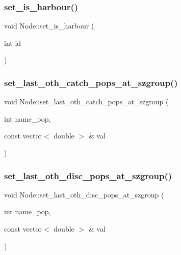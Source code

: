 \mbox{\label{class_node_a5200fc9b871d1dc60b4106fabd08a202}} 
\subsubsection{\texorpdfstring{set\_is\_harbour()}{set\_is\_harbour()}}
{\footnotesize\ttfamily void Node\+::set\+\_\+is\+\_\+harbour (\begin{DoxyParamCaption}\item[{int}]{id }\end{DoxyParamCaption})}

\mbox{\label{class_node_a6f1a02caac22fdd4ecf8ab2c28795141}} 
\subsubsection{\texorpdfstring{set\_last\_oth\_catch\_pops\_at\_szgroup()}{set\_last\_oth\_catch\_pops\_at\_szgroup()}}
{\footnotesize\ttfamily void Node\+::set\+\_\+last\+\_\+oth\+\_\+catch\+\_\+pops\+\_\+at\+\_\+szgroup (\begin{DoxyParamCaption}\item[{int}]{name\+\_\+pop,  }\item[{const vector$<$ double $>$ \&}]{val }\end{DoxyParamCaption})}

\mbox{\label{class_node_ab2426a0912b0ceb3570eeb85cf7e5377}} 
\subsubsection{\texorpdfstring{set\_last\_oth\_disc\_pops\_at\_szgroup()}{set\_last\_oth\_disc\_pops\_at\_szgroup()}}
{\footnotesize\ttfamily void Node\+::set\+\_\+last\+\_\+oth\+\_\+disc\+\_\+pops\+\_\+at\+\_\+szgroup (\begin{DoxyParamCaption}\item[{int}]{name\+\_\+pop,  }\item[{const vector$<$ double $>$ \&}]{val }\end{DoxyParamCaption})}

